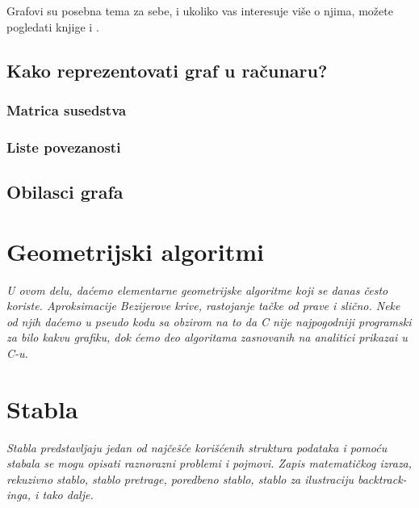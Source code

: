 \documentclass{memoir}
\begin{document}
Grafovi su posebna tema za sebe, i ukoliko vas interesuje više o njima, možete pogledati knjige \cite{diskretna_anderson} i \cite{diskretna_srb}.
\section{Kako reprezentovati graf u računaru?}

\subsection{Matrica susedstva}
\subsection{Liste povezanosti}

\section{Obilasci grafa}

\chapter{Geometrijski algoritmi}
\emph{U ovom delu, daćemo elementarne geometrijske algoritme koji se danas često koriste. Aproksimacije Bezijerove krive, 
rastojanje tačke od prave i slično. Neke od njih daćemo u pseudo kodu sa obzirom na to da C nije najpogodniji programski
za bilo kakvu grafiku, dok ćemo deo algoritama zasnovanih na analitici prikazai u C-u.}
\newpage

\chapter{Stabla}
\emph{Stabla predstavljaju jedan od najčešće korišćenih struktura podataka i pomoću stabala se mogu opisati raznorazni 
problemi i pojmovi. Zapis matematičkog izraza, rekuzivno stablo, stablo pretrage, poredbeno stablo, stablo za 
ilustraciju backtrack-inga, i tako dalje.}
\newpage
\end{document}
